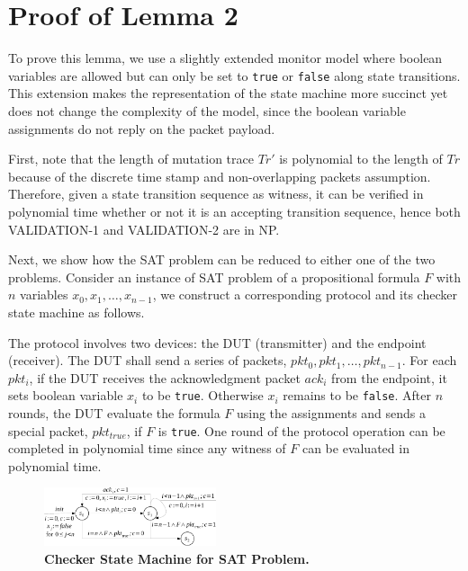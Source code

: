 \section{Proof of Lemma 2}
To prove this lemma, we use a slightly extended monitor model where
boolean variables are allowed but can only be set to \texttt{true} or
\texttt{false} along state transitions. This extension makes the representation
of the state machine more succinct yet does not change the complexity of the
model, since the boolean variable assignments do not reply on the packet
payload.

First, note that the length of mutation trace $Tr'$ is polynomial to the
length of $Tr$ because of the discrete time stamp and non-overlapping packets
assumption.
%
Therefore, given a state transition sequence as witness, it can be verified in
polynomial time whether or not it is an accepting transition sequence, hence
both VALIDATION-1 and VALIDATION-2 are in NP.

Next, we show how the SAT problem can be reduced to either one of the two
problems.
%
Consider an instance of SAT problem of a propositional formula $F$ with $n$
variables $x_0,x_1,\ldots, x_{n-1}$, we construct a corresponding protocol and
its checker state machine as follows.

The protocol involves two devices: the DUT (transmitter) and the endpoint
(receiver).
%
The DUT shall send a series of packets, $pkt_0, pkt_1,\ldots, pkt_{n-1}$.
%
For each $pkt_i$, if the DUT receives the
acknowledgment packet $ack_i$ from the endpoint, it sets boolean variable
$x_i$ to be \texttt{true}.
%
Otherwise $x_i$ remains to be \texttt{false}.
%
After $n$ rounds, the DUT evaluate the formula $F$ using the assignments and
sends a special packet, $pkt_{true}$, if $F$ is \texttt{true}.
%
One round of the protocol operation can be completed in polynomial time since
any witness of $F$ can be evaluated in polynomial time.

\begin{figure}
  \vspace*{-5mm}
  \centering
  \includegraphics[width=0.45\textwidth]{./figures/sat_sm.pdf}
  \caption{\textbf{Checker State Machine for SAT Problem.}}
  \label{fig:sat}
  \vspace*{-8mm}
\end{figure}



